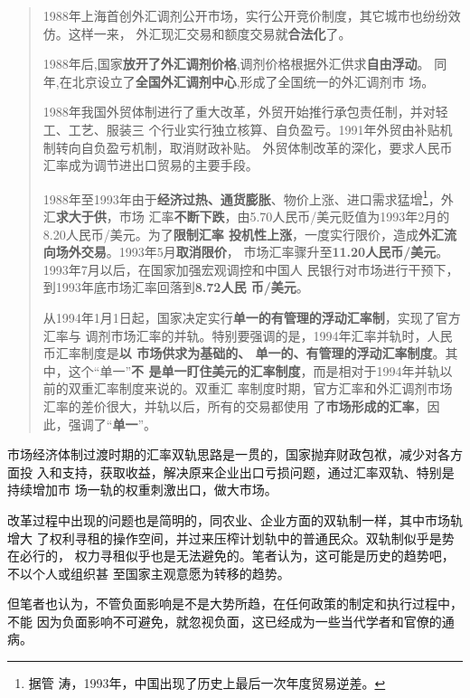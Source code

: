 \begin{quotation}
1988年上海首创外汇调剂公开市场，实行公开竞价制度，其它城市也纷纷效仿。这样一来，
外汇现汇交易和额度交易就\textbf{合法化}了。

1988年后,国家\textbf{放开了外汇调剂价格},调剂价格根据外汇供求\textbf{自由浮动}。
同年,在北京设立了\textbf{全国外汇调剂中心},形成了全国统一的外汇调剂市
场。\cite{wangqiangshehui}

1988年我国外贸体制进行了重大改革，外贸开始推行承包责任制，并对轻工、工艺、服装三
个行业实行独立核算、自负盈亏。1991年外贸由补贴机制转向自负盈亏机制，取消财政补贴。
外贸体制改革的深化，要求人民币汇率成为调节进出口贸易的主要手段。

1988年至1993年由于\textbf{经济过热、通货膨胀}、物价上涨、进口需求猛增\footnote{据管
  涛，1993年，中国出现了历史上最后一次年度贸易逆差。}，外汇\textbf{求大于供}，市场
汇率\textbf{不断下跌}，由5.70人民币/美元贬值为1993年2月的8.20人民币/美元。为了\textbf{限制汇率
  投机性上涨}，一度实行限价，造成\textbf{外汇流向场外交易}。1993年5月\textbf{取消限价}，
市场汇率骤升至\textbf{11.20人民币/美元}。1993年7月以后，在国家加强宏观调控和中国人
民银行对市场进行干预下，到1993年底市场汇率回落到\textbf{8.72人民
  币/美元}。\cite{huilvshi}

从1994年1月1日起，国家决定实行\textbf{单一的有管理的浮动汇率制}，实现了官方汇率与
调剂市场汇率的并轨。特别要强调的是，1994年汇率并轨时，人民币汇率制度是\textbf{以
  市场供求为基础的、 单一的、有管理的浮动汇率制度}。其中，这个“单一”\textbf{不
  是单一盯住美元的汇率制度}，而是相对于1994年并轨以前的双重汇率制度来说的。双重汇
率制度时期，官方汇率和外汇调剂市场汇率的差价很大，并轨以后，所有的交易都使用
了\textbf{市场形成的汇率}，因此，强调了“\textbf{单一}”。\cite{guantaohuigai}
\end{quotation}

市场经济体制过渡时期的汇率双轨思路是一贯的，国家抛弃财政包袱，减少对各方面投
入和支持，获取收益，解决原来企业出口亏损问题，通过汇率双轨、特别是持续增加市
场一轨的权重刺激出口，做大市场。

改革过程中出现的问题也是简明的，同农业、企业方面的双轨制一样，其中市场轨增大
了权利寻租的操作空间，并过来压榨计划轨中的普通民众。双轨制似乎是势在必行的，
权力寻租似乎也是无法避免的。笔者认为，这可能是历史的趋势吧，不以个人或组织甚
至国家主观意愿为转移的趋势。

但笔者也认为，不管负面影响是不是大势所趋，在任何政策的制定和执行过程中，不能
因为负面影响不可避免，就忽视负面，这已经成为一些当代学者和官僚的通
病。


